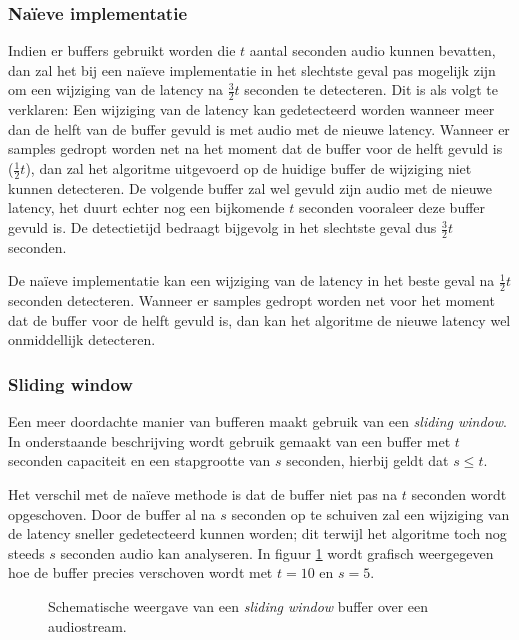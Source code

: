 \subsubsection{Naïeve implementatie}

Indien er buffers gebruikt worden die $ t $ aantal seconden audio kunnen bevatten, dan zal het bij een naïeve implementatie in het slechtste geval pas mogelijk zijn om een wijziging van de latency na $ \frac{3}{2} t $ seconden te detecteren. Dit is als volgt te verklaren: Een wijziging van de latency kan gedetecteerd worden wanneer meer dan de helft van de buffer gevuld is met audio met de nieuwe latency. Wanneer er samples gedropt worden net na het moment dat de buffer voor de helft gevuld is ($ \frac{1}{2} t $), dan zal het algoritme uitgevoerd op de huidige buffer de wijziging niet kunnen detecteren. De volgende buffer zal wel gevuld zijn audio met de nieuwe latency, het duurt echter nog een bijkomende $ t $ seconden vooraleer deze buffer gevuld is. De detectietijd bedraagt bijgevolg in het slechtste geval dus $ \frac{3}{2} t $ seconden.

De naïeve implementatie kan een wijziging van de latency in het beste geval na $ \frac{1}{2} t $ seconden detecteren. Wanneer er samples gedropt worden net voor het moment dat de buffer voor de helft gevuld is, dan kan het algoritme de nieuwe latency wel onmiddellijk detecteren.

\subsubsection{Sliding window}

Een meer doordachte manier van bufferen maakt gebruik van een \textit{sliding window}. In onderstaande beschrijving wordt gebruik gemaakt van een buffer met $ t $ seconden capaciteit en een stapgrootte van $ s $ seconden, hierbij geldt dat $ s \leq t $. 

Het verschil met de naïeve methode is dat de buffer niet pas na $ t $ seconden wordt opgeschoven. Door de buffer al na $ s $ seconden op te schuiven zal een wijziging van de latency sneller gedetecteerd kunnen worden; dit terwijl het algoritme toch nog steeds $ s $ seconden audio kan analyseren. In figuur \ref{slidingwindow} wordt grafisch weergegeven hoe de buffer precies verschoven wordt met $ t = 10 $ en $ s = 5 $.

\begin{figure}[h!]
	\captionsetup{width=0.7\textwidth}
	\caption[Schematische weergave van de buffer]{Schematische weergave van een \textit{sliding window} buffer over een audiostream.}
	\begin{center}
		\advance\parskip0.3cm
		
	\end{center}
	\label{slidingwindow}
\end{figure}

